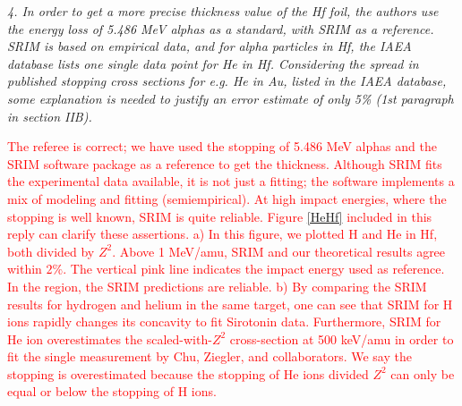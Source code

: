\documentclass[a4paper,10pt]{article}
\def\reviewer#1{\vspace{0.35cm}\textsl{#1}}
\def\reply#1{\vspace{0.1cm}\textcolor{red}{#1}}
\begin{document}
\reviewer{4. In order to get a more precise thickness value of the Hf 
foil, the authors use the energy loss of 5.486 MeV alphas as a standard, 
with SRIM as a reference. SRIM is based on empirical data, and for alpha 
particles in Hf, the IAEA database lists one single data point for He 
in Hf. Considering the spread in published stopping cross sections for 
e.g. He in Au, listed in the IAEA database, some explanation is needed 
to justify an error estimate of only 5\% (1st paragraph in section 
IIB).}

\reply{The referee is correct; we have used the stopping of 5.486 MeV
alphas and the SRIM software package as a reference to get the 
thickness. Although SRIM fits the experimental data available, it is not
just a fitting; the software implements a mix of modeling and fitting
(semiempirical). At high impact energies, where the stopping is well
known, SRIM is quite reliable. Figure \ref{HeHf} included in this
reply can clarify these assertions. a) In this figure, we plotted H and 
He in Hf, both divided by $Z^2$. Above 1 MeV/amu, SRIM and our
theoretical results agree within $2\%$. The vertical pink line indicates
the impact energy used as reference. In the region, the SRIM predictions
are reliable. b) By comparing the SRIM results for hydrogen and helium
in the same target, one can see that SRIM for H ions rapidly changes its
concavity to fit Sirotonin data. Furthermore, SRIM for He ion 
overestimates the scaled-with-$Z^2$ cross-section at 500 keV/amu in
order to fit the single measurement by Chu, Ziegler, and collaborators. 
We say the stopping is overestimated because the stopping of He ions 
divided $Z^2$ can only be equal or below the stopping of H ions.}
\end{document}
